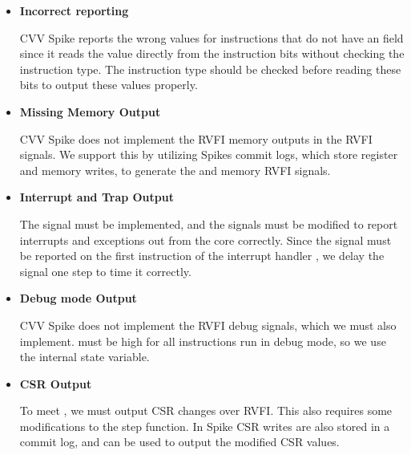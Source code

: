 \begin{itemize}
    \item \textbf{Incorrect  reporting}
    \par CVV Spike reports the wrong  values for instructions that do not have an  field since it reads the  value directly from the instruction bits without checking the instruction type. The instruction type should be checked before reading these bits to output these values properly.
    
    \item \textbf{Missing Memory Output}
    \par CVV Spike does not implement the RVFI memory outputs in the \mbox{} RVFI signals. We support this by utilizing Spikes commit logs, which store register and memory writes, to generate the  and memory RVFI signals.



    
    \item \textbf{Interrupt and Trap Output}
    \par The  signal must be implemented, and the  signals must be modified to report interrupts and exceptions out from the core correctly. Since the  signal must be reported on the first instruction of the interrupt handler \cite{openhwgroupRISCVFormalInterface2023}, we delay the  signal one step to time it correctly.
    
    \item \textbf{Debug mode Output}
    \par CVV Spike does not implement the RVFI debug signals, which we must also implement.  must be high for all instructions run in debug mode\cite{openhwgroupRISCVFormalInterface2023}, so we use the internal  state variable. 

    \item \textbf{CSR Output}
    \par To meet , we must output CSR changes over RVFI. This also requires some modifications to the step function. In Spike CSR writes are also stored in a commit log, and can be used to output the modified CSR values.
    
\end{itemize}



